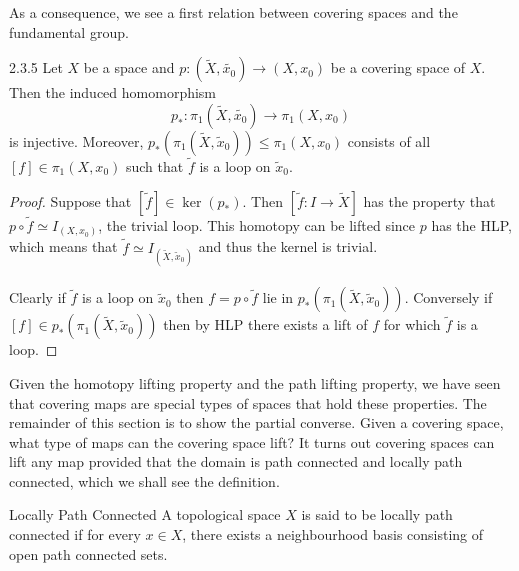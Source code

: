 \documentclass[a4paper]{article}
\begin{document}
As a consequence, we see a first relation between covering spaces and the fundamental group. 

\begin{prp}{}{2.3.5} Let $X$ be a space and $p:(\tilde{X},\tilde{x_0})\to(X,x_0)$ be a covering space of $X$. Then the induced homomorphism $$p_\ast:\pi_1(\tilde{X},\tilde{x_0})\to\pi_1(X,x_0)$$ is injective. Moreover, $p_\ast(\pi_1(\tilde{X},\tilde{x}_0))\leq\pi_1(X,x_0)$ consists of all $[f]\in\pi_1(X,x_0)$ such that $\tilde{f}$ is a loop on $\tilde{x}_0$. \tcbline
\begin{proof}
Suppose that $[\tilde{f}]\in\ker(p_\ast)$. Then $[\tilde{f}:I\to\tilde{X}]$ has the property that $p\circ\tilde{f}\simeq I_{(X,x_0)}$, the trivial loop. This homotopy can be lifted since $p$ has the HLP, which means that $\tilde{f}\simeq I_{(\tilde{X},\tilde{x}_0)}$ and thus the kernel is trivial. \\~\\
Clearly if $\tilde{f}$ is a loop on $\tilde{x}_0$ then $f=p\circ\tilde{f}$ lie in $p_\ast(\pi_1(\tilde{X},\tilde{x}_0))$. Conversely if $[f]\in p_\ast(\pi_1(\tilde{X},\tilde{x}_0))$ then by HLP there exists a lift of $f$ for which $\tilde{f}$ is a loop. 
\end{proof}
\end{prp}

Given the homotopy lifting property and the path lifting property, we have seen that covering maps are special types of spaces that hold these properties. The remainder of this section is to show the partial converse. Given a covering space, what type of maps can the covering space lift? It turns out covering spaces can lift any map provided that the domain is path connected and locally path connected, which we shall see the definition. 

\begin{defn}{Locally Path Connected}{} A topological space $X$ is said to be locally path connected if for every $x\in X$, there exists a neighbourhood basis consisting of open path connected sets. 
\end{defn}
\end{document}
